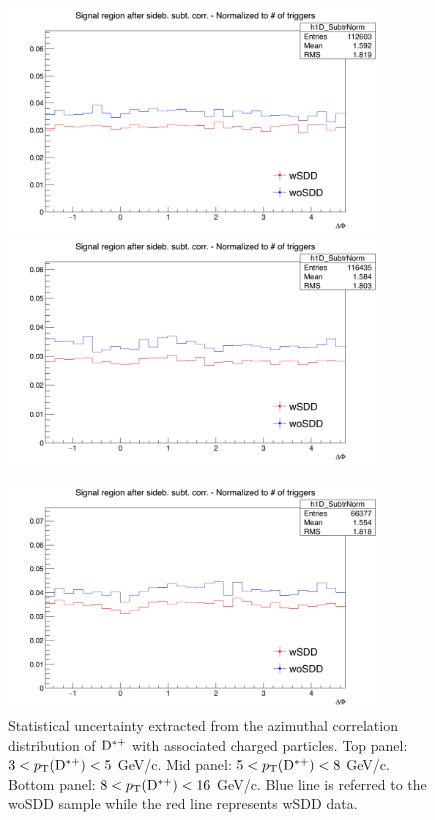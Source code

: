 \begin{figure}[!h]
\centering
\includegraphics[width=0.8\linewidth, height=6cm]{figures/wSDD_vs_woSDD/Uncertanty_AzimCorrDistr_Dstar_Canvas_PtIntBins2to3_PoolInt_thr0dot3to99dot0.png}
\includegraphics[width=0.8\linewidth, height=6cm]{figures/wSDD_vs_woSDD/Uncertanty_AzimCorrDistr_Dstar_Canvas_PtIntBins4to6_PoolInt_thr0dot3to99dot0.png}

\includegraphics[width=0.8\linewidth, height=6cm]{figures/wSDD_vs_woSDD/Uncertanty_AzimCorrDistr_Dstar_Canvas_PtIntBins7to9_PoolInt_thr0dot3to99dot0.png}
\caption{Statistical uncertainty extracted from the azimuthal correlation distribution of ${\rm D^{*+}}$ with associated charged particles. Top panel: $3 < p_{\rm T}({\rm D^{*+}}) < 5$ GeV/c.
Mid panel: $5 < p_{\rm T}({\rm D^{*+}}) < 8$ GeV/c. Bottom panel: $8 < p_{\rm T}({\rm D^{*+}}) < 16$ GeV/c.
Blue line is referred to the woSDD sample while the red line represents wSDD data.}
\label{wSSvswoSDDuncertainty}
\end{figure}

